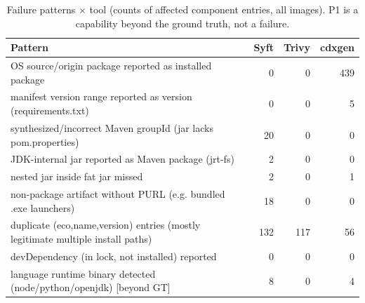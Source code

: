 \begin{table}[t]\centering\caption{Failure patterns $\times$ tool (counts of affected component entries, all images). P1 is a capability beyond the ground truth, not a failure.}\label{tab:failures}
\scriptsize\begin{tabular}{p{4.6cm}rrr}\toprule
Pattern & Syft & Trivy & cdxgen \\\midrule
OS source/origin package reported as installed package & 0 & 0 & 439 \\
manifest version range reported as version (requirements.txt) & 0 & 0 & 5 \\
synthesized/incorrect Maven groupId (jar lacks pom.properties) & 20 & 0 & 0 \\
JDK-internal jar reported as Maven package (jrt-fs) & 2 & 0 & 0 \\
nested jar inside fat jar missed & 2 & 0 & 1 \\
non-package artifact without PURL (e.g. bundled .exe launchers) & 18 & 0 & 0 \\
duplicate (eco,name,version) entries (mostly legitimate multiple install paths) & 132 & 117 & 56 \\
devDependency (in lock, not installed) reported & 0 & 0 & 0 \\
language runtime binary detected (node/python/openjdk) [beyond GT] & 8 & 0 & 4 \\
\bottomrule\end{tabular}\end{table}
